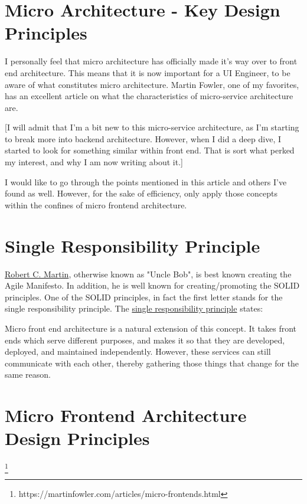 \section{Micro Architecture - Key Design Principles}
I personally feel that micro architecture has officially made it's way over to front end architecture. This means that it is now important for a UI Engineer, to be aware of what constitutes micro architecture. Martin Fowler, one of my favorites, has an excellent article on what the characteristics of micro-service architecture are.

[I will admit that I'm a bit new to this micro-service architecture, as I'm starting to break more into backend architecture. However, when I did a deep dive, I started to look for something similar within front end. That is sort what perked my interest, and why I am now writing about it.]

I would like to go through the points mentioned in this article and others I've found as well. However, for the sake of efficiency, only apply those concepts within the confines of micro frontend architecture.

\section{Single Responsibility Principle}
\href{https://en.wikipedia.org/wiki/Robert_C._Martin}{Robert C. Martin}, otherwise known as "Uncle Bob", is best known creating the Agile Manifesto. In addition, he is well known for creating/promoting the SOLID principles. One of the SOLID principles, in fact the first letter stands for the single responsibility principle. The \href{https://en.wikipedia.org/wiki/Single_responsibility_principle}{single responsibility principle} states:

\begin{quote}
\end{quote}

Micro front end architecture is a natural extension of this concept. It takes front ends which serve different purposes, and makes it so that they are developed, deployed, and maintained independently. However, these services can still communicate with each other, thereby gathering those things that change for the same reason.

\section{Micro Frontend Architecture Design Principles}
\begin{quote}
\end{quote} 
\footnote{https://martinfowler.com/articles/micro-frontends.html}

